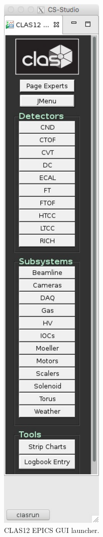 \documentclass[12pt]{article}
\begin{document}
\begin{figure}[htp]
{\centering \includegraphics[scale=0.65]{CLAS_CSS.pdf}\par}
\caption{\small{CLAS12 EPICS GUI launcher.}}
\label{clascss}
\end{figure}
\end{document}
